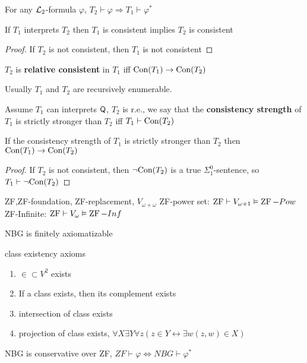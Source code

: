 \documentclass[11pt]{article}
\begin{document}
\begin{definition}[]
For any \(\mathcal{L}_2\)-formula \(\varphi\), \(T_2\vdash\varphi\Rightarrow T_1\vdash\varphi^*\)
\end{definition}

\begin{fact}[]
If \(T_1\) interprets \(T_2\) then \(T_1\) is consistent implies \(T_2\) is consistent
\end{fact}

\begin{proof}
If \(T_2\) is not consistent, then \(T_1\) is not consistent
\end{proof}

\begin{definition}
\(T_2\) is \textbf{relative consistent} in \(T_1\) iff \(\text{Con}(T_1)\to\text{Con}(T_2)\)
\end{definition}

Usually \(T_1\) and \(T_2\) are recursively enumerable.

\begin{definition}
Assume \(T_1\)  can interprets \(\textsf{Q}\), \(T_2\) is r.e., we say that the \textbf{consistency strength}
of \(T_1\) is strictly stronger than \(T_2\)  iff \(T_1\vdash\text{Con}(T_2)\)
\end{definition}

\begin{fact}[]
If the consistency strength of \(T_1\) is strictly stronger than \(T_2\) then \(\text{Con}(T_1)\to\text{Con}(T_2)\)
\end{fact}

\begin{proof}
If \(T_2\) is not consistent, then \(\neg\text{Con}(T_2)\) is a true \(\Sigma_1^0\)-sentence, so \(T_1\vdash\neg\text{Con}(T_2)\)
\end{proof}

ZF,ZF-foundation,
ZF-replacement, \(V_{\omega+\omega}\)
ZF-power set: \(\operatorname{ZF}\vdash V_{\omega+1}\vDash\operatorname{ZF}-Pow\)
ZF-Infinite: \(\operatorname{ZF}\vdash V_\omega\vDash\operatorname{ZF}-Inf\)


NBG is finitely axiomatizable

class existency axioms
\begin{enumerate}
\item \(\in\subset V^2\) exists
\item If a class exists, then its complement exists
\item intersection of class exists
\item projection of class exists, \(\forall X\exists Y\forall z(z\in Y\leftrightarrow\exists w(z,w)\in X)\)
\end{enumerate}

\begin{fact}[]
NBG is conservative over ZF, \(ZF\vdash\varphi\Leftrightarrow NBG\vdash\varphi^*\)
\end{fact}
\end{document}

